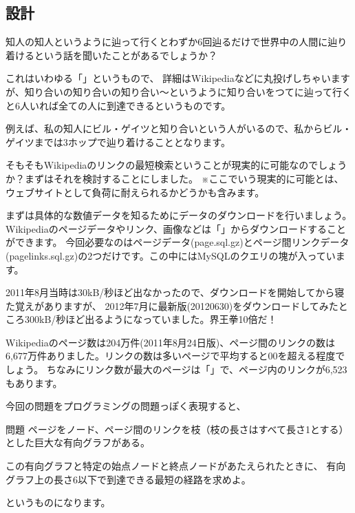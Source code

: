 \subsection{設計}
知人の知人というように辿って行くとわずか6回辿るだけで世界中の人間に辿り着けるという話を聞いたことがあるでしょうか？

これはいわゆる「」というもので、
詳細はWikipediaなどに丸投げしちゃいますが、知り合いの知り合いの知り合い〜というように知り合いをつてに辿って行くと6人いれば全ての人に到達できるというものです。

例えば、私の知人にビル・ゲイツと知り合いという人がいるので、私からビル・ゲイツまでは3ホップで辿り着けることとなります。

そもそもWikipediaのリンクの最短検索ということが現実的に可能なのでしょうか？まずはそれを検討することにしました。
※ここでいう現実的に可能とは、ウェブサイトとして負荷に耐えられるかどうかも含みます。

まずは具体的な数値データを知るためにデータのダウンロードを行いましょう。
Wikipediaのページデータやリンク、画像などは「」からダウンロードすることができます。
今回必要なのはページデータ(page.sql.gz)とページ間リンクデータ(pagelinks.sql.gz)の2つだけです。この中にはMySQLのクエリの塊が入っています。

2011年8月当時は30kB/秒ほど出なかったので、ダウンロードを開始してから寝た覚えがありますが、
2012年7月に最新版(20120630)をダウンロードしてみたところ300kB/秒ほど出るようになっていました。界王拳10倍だ！

Wikipediaのページ数は204万件(2011年8月24日版)、ページ間のリンクの数は6,677万件ありました。リンクの数は多いページで平均すると00を超える程度でしょう。
ちなみにリンク数が最大のページは「」で、ページ内のリンクが6,523もあります。

今回の問題をプログラミングの問題っぽく表現すると、
\begin{itembox}{問題}
ページをノード、ページ間のリンクを枝（枝の長さはすべて長さ1とする）とした巨大な有向グラフがある。

この有向グラフと特定の始点ノードと終点ノードがあたえられたときに、
有向グラフ上の長さ6以下で到達できる最短の経路を求めよ。
\end{itembox}
というものになります。

